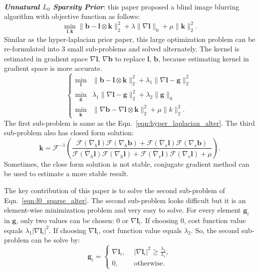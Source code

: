 \documentclass[journal, onecolumn, 10pt]{IEEEtran}
\begin{document}
~\\
\textbf{\emph{Unnatural $L_0$ Sparsity Prior}}\cite{xu2013unnatural}: this paper proposed a blind image blurring algorithm with objective function as follows:
\begin{equation}
\min_{\mathbf{l}, \mathbf{k}} \| \mathbf{b} - \mathbf{l} \otimes \mathbf{k} \|_2^2 + \lambda \|\nabla \mathbf{l} \|_0 + \mu \| \mathbf{k} \|_2^2.
\label{eqn:l0_sparse}
\end{equation}
Similar as the hyper-laplacian prior paper, this large optimization problem can be re-formulated into 3 small sub-problems and solved alternately. The kernel is estimated in gradient space $\nabla\mathbf{l}$, $\nabla\mathbf{b}$ to replace $\mathbf{l}$, $\mathbf{b}$, because estimating kernel in gradient space is more accurate\cite{cho2009fast}.
\begin{equation}
\begin{cases}
\min_{\mathbf{l}} &\| \mathbf{b} - \mathbf{l} \otimes \mathbf{k} \|_2^2 + \lambda_1 \|\nabla \mathbf{l} - \mathbf{g}\|_2^2 \\
\min_{\mathbf{g}} &\lambda_1\|\nabla \mathbf{l} - \mathbf{g}\|_2^2 + \lambda_2\|\mathbf{g}\|_{0} \\
\min_{\mathbf{k}} &\| \nabla\mathbf{b} - \nabla\mathbf{l} \otimes \mathbf{k} \|_2^2 + \mu \|k\|_2^2.
\end{cases}
\label{eqn:l0_sparse_alter}
\end{equation}
The first sub-problem is same as the Eqn.~\ref{eqn:hyper_laplacian_alter}. The third sub-problem also has closed form solution:
\begin{equation}
\mathbf{k} = \mathcal{F}^{-1} \left( \frac{\overline{\mathcal{F}(\nabla_h\mathbf{l})}\mathcal{F}(\nabla_h\mathbf{b}) + 
\overline{\mathcal{F}(\nabla_v\mathbf{l})}\mathcal{F}(\nabla_v\mathbf{b})}
{\overline{\mathcal{F}(\nabla_h\mathbf{l})}\mathcal{F}(\nabla_h\mathbf{l}) + 
\overline{\mathcal{F}(\nabla_v\mathbf{l})}\mathcal{F}(\nabla_v\mathbf{l}) + \mu} \right).
\label{eqn:l2_kernel_close_form}
\end{equation}
Sometimes, the close form solution is not stable, conjugate gradient method can be used to estimate a more stable result.

The key contribution of this paper is to solve the second sub-problem of Eqn.~\ref{eqn:l0_sparse_alter}. 
The second sub-problem looks difficult but it is an element-wise minimization problem and very easy to solve. For every element $\mathbf{g}_i$ in $\mathbf{g}$, only two values can be chosen: $0$ or $\nabla \mathbf{l}_i$. If choosing $0$, cost function value equals $\lambda_1 |\nabla \mathbf{l}_i|^2$. If choosing $\nabla \mathbf{l}_i$, cost function value equals $\lambda_2$. So, the second sub-problem can be solve by:
\begin{equation}
\mathbf{g}_i = 
\begin{cases}
\nabla\mathbf{l}_i, &~~ |\nabla\mathbf{l}_i|^2 \geqslant \frac{\lambda_2}{\lambda_1}, \\
0, &~~ \text{otherwise}.
\end{cases}
\label{eqn:l0_solver_original}
\end{equation}
\end{document}
